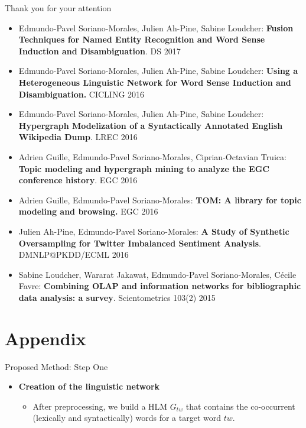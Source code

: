 \documentclass[10pt,=table]{beamer}
\begin{document}
\begin{frame}{\textcolor{greenEric}{Thank you for your attention}}
\begin{itemize}
	\item \footnotesize Edmundo-Pavel Soriano-Morales, Julien Ah-Pine, Sabine Loudcher: \textbf{Fusion Techniques for Named Entity Recognition and Word Sense Induction and Disambiguation}. DS 2017
	\item \footnotesize Edmundo-Pavel Soriano-Morales, Julien Ah-Pine, Sabine Loudcher:
	\textbf{Using a Heterogeneous Linguistic Network for Word Sense Induction and Disambiguation.} CICLING 2016
	\item \footnotesize Edmundo-Pavel Soriano-Morales, Julien Ah-Pine, Sabine Loudcher:
		\textbf{Hypergraph Modelization of a Syntactically Annotated English Wikipedia Dump}. LREC 2016
	\item \footnotesize Adrien Guille, Edmundo-Pavel Soriano-Morales, Ciprian-Octavian Truica:
\textbf{Topic modeling and hypergraph mining to analyze the EGC conference history}. EGC 2016
\item \footnotesize Adrien Guille, Edmundo-Pavel Soriano-Morales:
\textbf{TOM: A library for topic modeling and browsing.} EGC 2016
\item \footnotesize Julien Ah-Pine, Edmundo-Pavel Soriano-Morales: \textbf{A Study of Synthetic Oversampling for Twitter Imbalanced Sentiment Analysis}. DMNLP@PKDD/ECML 2016

\item \footnotesize Sabine Loudcher, Wararat Jakawat, Edmundo-Pavel Soriano-Morales, C\'{e}cile Favre:	\textbf{Combining OLAP and information networks for bibliographic data analysis: a survey}. Scientometrics 103(2) 2015
\end{itemize}
\end{frame}

%


%

\section{Appendix}	
\appendix
\begin{frame}{Proposed Method: Step One}

\begin{itemize}
	\item \textbf{Creation of the linguistic network}
	\begin{itemize}
		\item After preprocessing, we build a HLM $G_{tw}$ that contains the co-occurrent (lexically and syntactically) words for a target word $tw$.
	\end{itemize}
\end{itemize}
\end{frame}	
	
\end{document}
